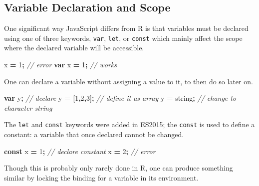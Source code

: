 \documentclass[
]{krantz}
\makeatletter
\newenvironment{Shaded}{\begin{snugshade}}{\end{snugshade}}
\newcommand{\CommentTok}[1]{\textcolor[rgb]{0.37,0.37,0.37}{\textit{#1}}}
\newcommand{\DecValTok}[1]{\textcolor[rgb]{0.06,0.06,0.06}{#1}}
\newcommand{\KeywordTok}[1]{\textcolor[rgb]{0.27,0.27,0.27}{\textbf{#1}}}
\newcommand{\NormalTok}[1]{#1}
\newcommand{\OperatorTok}[1]{\textcolor[rgb]{0.43,0.43,0.43}{\textbf{#1}}}
\newcommand{\StringTok}[1]{\textcolor[rgb]{0.5,0.5,0.5}{#1}}
\newenvironment{kframe}{%
\medskip{}
\setlength{\fboxsep}{.8em}
 \def\at@end@of@kframe{}%
 \ifinner\ifhmode%
  \def\at@end@of@kframe{\end{minipage}}%
  \begin{minipage}{\columnwidth}%
 \fi\fi%
 \def\FrameCommand##1{\hskip\@totalleftmargin \hskip-\fboxsep
 \colorbox{shadecolor}{##1}\hskip-\fboxsep
     \hskip-\linewidth \hskip-\@totalleftmargin \hskip\columnwidth}%
 \MakeFramed {\advance\hsize-\width
   \@totalleftmargin\z@ \linewidth\hsize
   \@setminipage}}%
 {\par\unskip\endMakeFramed%
 \at@end@of@kframe}
\renewenvironment{Shaded}{\begin{kframe}}{\end{kframe}}
\makeatother
\begin{document}
\hypertarget{basics-var-scope}{%
\subsection{Variable Declaration and Scope}\label{basics-var-scope}}

One significant way JavaScript differs from R is that variables must be declared using one of three keywords, \texttt{var}, \texttt{let}, or \texttt{const} which mainly affect the scope where the declared variable will be accessible.

\begin{Shaded}
\begin{Highlighting}[]
\NormalTok{x }\OperatorTok{=} \DecValTok{1}\OperatorTok{;} \CommentTok{// error}
\KeywordTok{var}\NormalTok{ x }\OperatorTok{=} \DecValTok{1}\OperatorTok{;} \CommentTok{// works}
\end{Highlighting}
\end{Shaded}

One can declare a variable without assigning a value to it, to then do so later on.

\begin{Shaded}
\begin{Highlighting}[]
\KeywordTok{var}\NormalTok{ y}\OperatorTok{;} \CommentTok{// declare }
\NormalTok{y }\OperatorTok{=}\NormalTok{ [}\DecValTok{1}\OperatorTok{,}\DecValTok{2}\OperatorTok{,}\DecValTok{3}\NormalTok{]}\OperatorTok{;} \CommentTok{// define it as array}
\NormalTok{y }\OperatorTok{=} \StringTok{\textquotesingle{}string\textquotesingle{}}\OperatorTok{;} \CommentTok{// change to character string}
\end{Highlighting}
\end{Shaded}

The \texttt{let} and \texttt{const} keywords were added in ES2015; the \texttt{const} is used to define a constant: a variable that once declared cannot be changed.

\begin{Shaded}
\begin{Highlighting}[]
\KeywordTok{const}\NormalTok{ x }\OperatorTok{=} \DecValTok{1}\OperatorTok{;} \CommentTok{// declare constant}
\NormalTok{x }\OperatorTok{=} \DecValTok{2}\OperatorTok{;} \CommentTok{// error}
\end{Highlighting}
\end{Shaded}

Though this is probably only rarely done in R, one can produce something similar by locking the binding for a variable in its environment.
\end{document}
